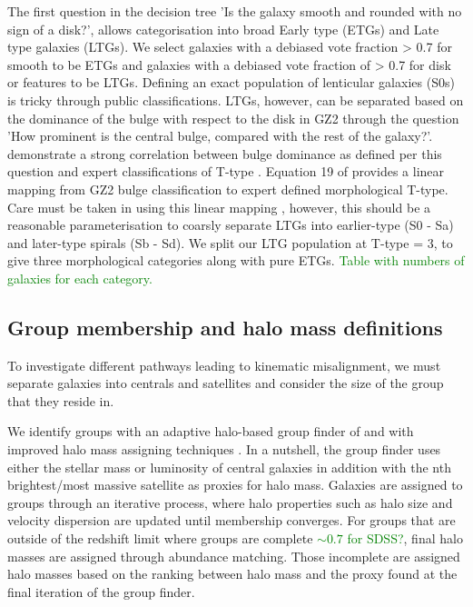 \documentclass[fleqn,usenatbib]{mnras}
\newcommand{\green}[1]{{\textcolor{green}{#1}}}
\begin{document}
The first question in the decision tree 'Is the galaxy smooth and rounded with no sign of a disk?', allows categorisation into broad Early type (ETGs) and Late type galaxies (LTGs). We select galaxies with a debiased vote fraction > 0.7 for smooth to be ETGs and galaxies with a debiased vote fraction of > 0.7 for disk or features to be LTGs. Defining an exact population of lenticular galaxies (S0s) is tricky through public classifications. LTGs, however, can be separated based on the dominance of the bulge with respect to the disk in GZ2 through the question 'How prominent is the central bulge, compared with the rest of the galaxy?'. \citep{willett2013} demonstrate a strong correlation between bulge dominance as defined per this question and expert classifications of T-type \citep{nair2010}. Equation 19 of \citet{willett2013} provides a linear mapping from GZ2 bulge classification to expert defined morphological T-type. Care must be taken in using this linear mapping \citep[see discussion in][]{willett2013}, however, this should be a reasonable parameterisation to coarsly separate LTGs into earlier-type (S0 - Sa) and later-type spirals (Sb - Sd). We split our LTG population at T-type = 3, to give three morphological categories along with pure ETGs. \green{Table with numbers of galaxies for each category.}

\subsection{Group membership and halo mass definitions} \label{sec:group_def}
To investigate different pathways leading to kinematic misalignment, we must separate galaxies into centrals and satellites and consider the size of the group that they reside in. 

We identify groups with an adaptive halo-based group finder of \citet{yang2005,yang2007} and with improved halo mass assigning techniques \citep[see;][for details and application to SDSS]{lim2017}. In a nutshell, the group finder uses either the stellar mass or luminosity of central galaxies in addition with the nth brightest/most massive satellite as proxies for halo mass. Galaxies are assigned to groups through an iterative process, where halo properties such as halo size and velocity dispersion are updated until membership converges. For groups that are outside of the redshift limit where groups are complete \green{$\sim 0.7$ for SDSS?}, final halo masses are assigned through abundance matching. Those incomplete are assigned halo masses based on the ranking between halo mass and the proxy found at the final iteration of the group finder.
\end{document}
